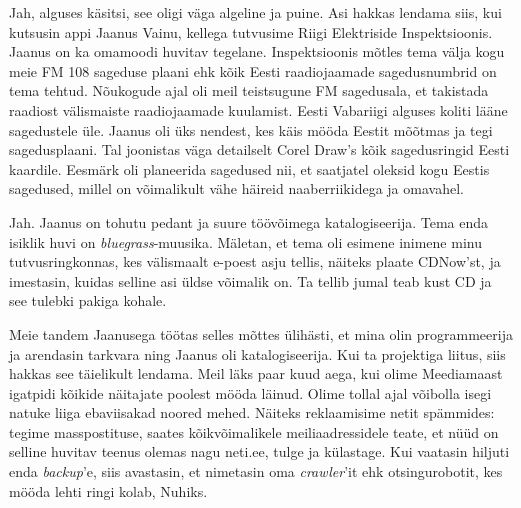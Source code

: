 
Jah, alguses käsitsi, see oligi väga 
algeline ja puine. Asi hakkas lendama siis, kui kutsusin appi Jaanus Vainu, kellega tutvusime 
Riigi Elektriside Inspektsioonis. 
Jaanus on ka omamoodi huvitav tegelane. Inspektsioonis mõtles tema 
välja kogu meie FM 108 sageduse plaani ehk kõik Eesti raadiojaamade 
sagedusnumbrid on tema tehtud. Nõukogude ajal oli meil teistsugune FM 
sagedusala, et takistada raadiost 
välismaiste raadiojaamade kuulamist. Eesti Vabariigi alguses 
koliti lääne sagedustele üle. Jaanus oli üks nendest, kes käis mööda Eestit 
mõõtmas ja tegi sagedusplaani. Tal joonistas väga detailselt Corel Draw's kõik sagedusringid Eesti kaardile. Eesmärk 
oli planeerida sagedused nii, et saatjatel oleksid kogu Eestis sagedused, 
millel on võimalikult vähe häireid naaberriikidega ja omavahel. 


Jah. Jaanus on tohutu pedant ja suure töövõimega katalogiseerija. 
Tema enda isiklik huvi on \emph{bluegrass}-muusika. Mäletan, et tema oli esimene 
inimene minu tutvusringkonnas, kes välismaalt e-poest asju tellis, näiteks plaate 
CDNow'st, ja imestasin, kuidas selline asi üldse 
võimalik on. Ta tellib jumal teab kust CD ja see tulebki pakiga kohale.


Meie tandem Jaanusega töötas selles mõttes ülihästi, et mina olin 
programmeerija ja arendasin tarkvara ning Jaanus oli katalogiseerija. Kui ta 
projektiga liitus, siis hakkas see täielikult 
lendama. Meil läks paar kuud aega, kui olime 
Meediamaast igatpidi kõikide näitajate poolest mööda läinud. 
Olime tollal ajal võibolla isegi natuke liiga ebaviisakad noored mehed. 
Näiteks reklaamisime netit spämmides: tegime 
masspostituse, saates kõikvõimalikele meiliaadressidele teate, et nüüd 
on selline huvitav teenus olemas nagu neti.ee, tulge ja külastage. Kui vaatasin hiljuti enda \emph{backup}'e, siis 
avastasin, et nimetasin oma \emph{crawler}'it ehk otsingurobotit, kes mööda lehti 
ringi kolab, Nuhiks. 


